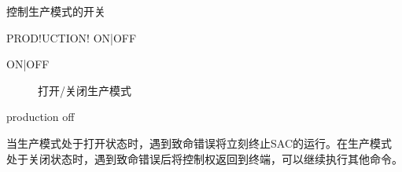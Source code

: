 \label{cmd:production}

控制生产模式的开关

\begin{SACSTX}
PROD!UCTION! ON|OFF
\end{SACSTX}

\begin{description}
\item [ON|OFF] 打开/关闭生产模式
\end{description}

\begin{SACDFT}
production off
\end{SACDFT}

当生产模式处于打开状态时，遇到致命错误将立刻终止SAC的运行。在生产模式
处于关闭状态时，遇到致命错误后将控制权返回到终端，可以继续执行其他命令。
